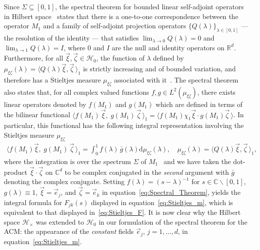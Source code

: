 \documentclass{cmslatex}
\renewcommand{\d}{\text{d}}
\begin{document}
Since $\Sigma\subseteq[0,1]$, the spectral theorem for bounded linear self-adjoint
operators in Hilbert space~\cite{Stone:64} states that there is a
one-to-one correspondence between the operator $M_1$ and a family of
self-adjoint projection operators $\{Q(\lambda)\}_{\lambda\in[0,1]}$ --- the
resolution of the identity --- that satisfies $\lim_{\lambda\to0}Q(\lambda)=0$ and
$\lim_{\lambda\to1}Q(\lambda)=I$, where $0$ and $I$ are the null and identity
operators on $\mathbb{R}^d$. Furthermore, for all
$\vec{\xi},\vec{\zeta}\in\mathscr{H}_0$, the function of $\lambda$ defined by 
$\mu_{\xi\zeta}(\lambda)=\langle Q(\lambda)\vec{\xi},\vec{\zeta}\,\rangle_1$ is strictly increasing and of
bounded variation, and therefore has a Stieltjes measure $\mu_{\xi\zeta}$
associated with it~\cite{Stieltjes:1995,Stone:64,Folland:99}. The
spectral theorem also states \cite{Stone:64} that, for all complex
valued functions $f,g\in L^2(\mu_{\xi\zeta})$, there exists linear operators
denoted by $f(M_1)$ and $g(M_1)$ which are defined in terms of the
bilinear functional
$\langle f(M_1)\,\vec{\xi},\;g(M_1)\,\vec{\zeta}\,\rangle_1=\langle
f(M_1)\chi_1\vec{\xi}\cdot g(M_1)\vec{\zeta}\,\rangle$. In particular,
this functional has the following integral representation involving the
Stieltjes measure $\mu_{\xi\zeta}$  
% 
\begin{align}\label{eq:Spectral_Theorem}  
  \langle f(M_1)\vec{\xi},\;g(M_1)\,\vec{\zeta}\,\rangle_1= \int_0^1f(\lambda)\,\bar{g}(\lambda)\d\mu_{\xi\zeta}(\lambda), \quad
  \mu_{\xi\zeta}(\lambda)=\langle Q(\lambda)\vec{\xi},\vec{\zeta}\,\rangle_1,
\end{align}
%
where the integration is over the spectrum $\Sigma$ of
$M_1$~\cite{Reed-1980,Stone:64} and we have taken the dot-product
$\vec{\xi}\cdot\vec{\zeta}$ on $\mathbb{C}^d$ to be complex conjugated in the
\emph{second} argument with $\bar{g}$ denoting the complex
conjugate. Setting $f(\lambda)=(s-\lambda)^{-1}$ for $s\in\mathbb{C}\backslash[0,1]$,
$g(\lambda)\equiv1$, $\vec{\xi}=\vec{e}_j$, and $\vec{\zeta}=\vec{e}_k$ in
equation~\eqref{eq:Spectral_Theorem}, yields the integral formula for  
$F_{jk}(s)$ displayed in equation~\eqref{eq:Stieltjes_m}, which is
equivalent to that displayed in~\eqref{eq:Stieltjes_F}. It is now
clear why the Hilbert space $\mathscr{H}_\times$ was extended to
$\mathscr{H}_0$ in our formulation of the spectral theorem for the
ACM: the appearance of the \emph{constant} fields $\vec{e}_j$,
$j=1,\ldots,d$, in equation~\eqref{eq:Stieltjes_m}.
\end{document}
